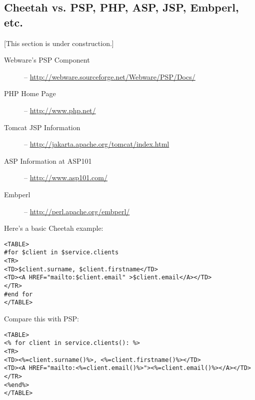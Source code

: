 \subsection{Cheetah vs. PSP, PHP, ASP, JSP, Embperl, etc.}
\label{comparisons.pspEtc}

[This section is under construction.]

\begin{description}
\item[Webware's PSP Component] -- \url{http://webware.sourceforge.net/Webware/PSP/Docs/}
\item[PHP Home Page] -- \url{http://www.php.net/}
\item[Tomcat JSP Information] -- \url{http://jakarta.apache.org/tomcat/index.html}
\item[ASP Information at ASP101] -- \url{http://www.asp101.com/}
\item[Embperl] -- \url{http://perl.apache.org/embperl/}
\end{description}


Here's a basic Cheetah example:
\begin{verbatim}
<TABLE>
#for $client in $service.clients
<TR>
<TD>$client.surname, $client.firstname</TD>
<TD><A HREF="mailto:$client.email" >$client.email</A></TD>
</TR>
#end for
</TABLE>
\end{verbatim}

Compare this with PSP:

\begin{verbatim}
<TABLE>
<% for client in service.clients(): %>
<TR>
<TD><%=client.surname()%>, <%=client.firstname()%></TD>
<TD><A HREF="mailto:<%=client.email()%>"><%=client.email()%></A></TD>
</TR>
<%end%>
</TABLE>
\end{verbatim}


